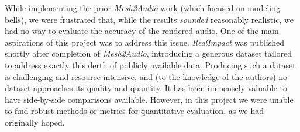 \documentclass[12pt]{article}
\begin{document}
While implementing the prior \textit{Mesh2Audio} work (which focused on modeling bells), we were frustrated that, while the results \textit{sounded} reasonably realistic, we had no way to evaluate the accuracy of the rendered audio.
One of the main aspirations of this project was to address this issue.
\textit{RealImpact} was published shortly after completion of \textit{Mesh2Audio}, introducing a generous dataset tailored to address exactly this derth of publicly available data.
Producing such a dataset is challenging and resource intensive, and (to the knowledge of the authors) no dataset approaches its quality and quantity.
It has been immensely valuable to have side-by-side comparisons available.
However, in this project we were unable to find robust methods or metrics for quantitative evaluation, as we had originally hoped.
\end{document}
